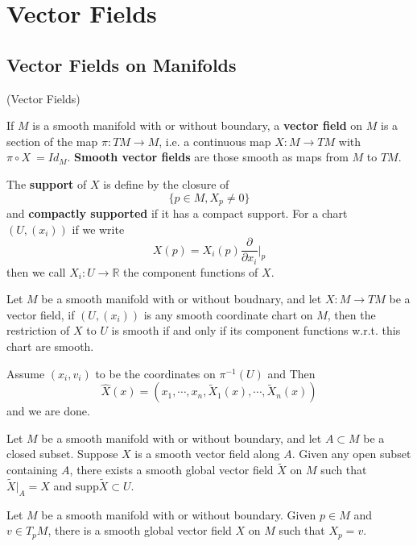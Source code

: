 \section{Vector Fields}

\subsection{Vector Fields on Manifolds}

\begin{definition}(Vector Fields)\par
    If $M$ is a smooth manifold with or without boundary, a \textbf{vector field} on $M$ is a section of the map $\pi:TM \to M$, i.e. a continuous map $X:M\to TM$ with $\pi \circ X\ = Id_M$.
    \textbf{Smooth vector fields} are those smooth as maps from $M$ to $TM$.\par
    The \textbf{support} of $X$ is define by the closure of
    \[\{p\in M,X_p \neq 0\}\]
    and \textbf{compactly supported} if it has a compact support.
    For a chart $(U,(x_i))$ if we write
    \[X(p) = X_i(p)\dfrac{\partial}{\partial x_i}\Big|_{p}\]
    then we call $X_i:U\to \mathbb{R}$ the component functions of $X$.
\end{definition}

\begin{proposition}
    Let $M$ be a smooth manifold with or without boudnary, and let $X:M\to TM$ be a vector field, if $(U,(x_i))$ is any smooth coordinate chart on $M$, then the restriction of $X$ to $U$ is smooth if and only if its component functions w.r.t. this chart are smooth.
\end{proposition}
\Pf\par
    Assume $(x_i,v_i)$ to be the coordinates on $\pi^{-1}(U)$ and  Then
    \[\hat{X}(x) = (x_1,\cdots,x_n,\tilde{X}_1(x),\cdots,\tilde{X}_n(x))\]
    and we are done.

\begin{lemma}
    Let $M$ be a smooth manifold with or without boundary, and let $A\subset M$ be a closed subset. Suppose $X$ is a smooth vector field along $A$. Given any open subset containing $A$, there exists a smooth global vector field $\tilde{X}$ on $M$ such that $\tilde{X}|_A = X$ and $\text{supp}\tilde{X}\subset U$.
\end{lemma}

\begin{proposition}
    Let $M$ be a smooth manifold with or without boundary. Given $p\in M$ and $v\in T_pM$, there is a smooth global vector field $X$ on $M$ such that $X_p = v$.
\end{proposition}

